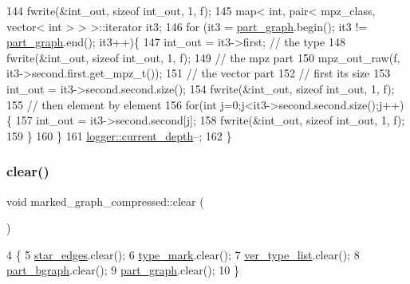 \begin{DoxyCode}
144   fwrite(&int\_out, \textcolor{keyword}{sizeof} int\_out, 1, f);
145   map< int, pair< mpz\_class, vector< int > > >::iterator it3;
146   \textcolor{keywordflow}{for} (it3 = \hyperlink{classmarked__graph__compressed_ae179a4737e6eab905c18a94d44ef64b7}{part\_graph}.begin(); it3 != \hyperlink{classmarked__graph__compressed_ae179a4737e6eab905c18a94d44ef64b7}{part\_graph}.end(); it3++)\{
147     int\_out = it3->first; \textcolor{comment}{// the type}
148     fwrite(&int\_out, \textcolor{keyword}{sizeof} int\_out, 1, f);
149     \textcolor{comment}{// the mpz part}
150     mpz\_out\_raw(f, it3->second.first.get\_mpz\_t());
151     \textcolor{comment}{// the vector part}
152     \textcolor{comment}{// first its size}
153     int\_out = it3->second.second.size();
154     fwrite(&int\_out, \textcolor{keyword}{sizeof} int\_out, 1, f);
155     \textcolor{comment}{// then element by element}
156     \textcolor{keywordflow}{for}(\textcolor{keywordtype}{int} j=0;j<it3->second.second.size();j++)\{
157       int\_out = it3->second.second[j];
158       fwrite(&int\_out, \textcolor{keyword}{sizeof} int\_out, 1, f);
159     \}
160   \}
161   \hyperlink{classlogger_a9d29b49bd318a719a8e85b59eac54fe0}{logger::current\_depth}--;
162 \}
\end{DoxyCode}
\mbox{\label{classmarked__graph__compressed_af58307bfadcaa4c3ca6dd594c2f9b3a9}} 
\subsubsection{\texorpdfstring{clear()}{clear()}}
{\footnotesize\ttfamily void marked\+\_\+graph\+\_\+compressed\+::clear (\begin{DoxyParamCaption}{ }\end{DoxyParamCaption})}


\begin{DoxyCode}
4 \{
5   \hyperlink{classmarked__graph__compressed_a7df5779d313486644132bd816937f532}{star\_edges}.clear();
6   \hyperlink{classmarked__graph__compressed_a86b00223525703e973415cbc9c94da68}{type\_mark}.clear();
7   \hyperlink{classmarked__graph__compressed_af2e3e55223d436628a02758dfae88493}{ver\_type\_list}.clear();
8   \hyperlink{classmarked__graph__compressed_a7b3267063fba30b45eb21b3ba4e07536}{part\_bgraph}.clear();
9   \hyperlink{classmarked__graph__compressed_ae179a4737e6eab905c18a94d44ef64b7}{part\_graph}.clear();
10 \}
\end{DoxyCode}


